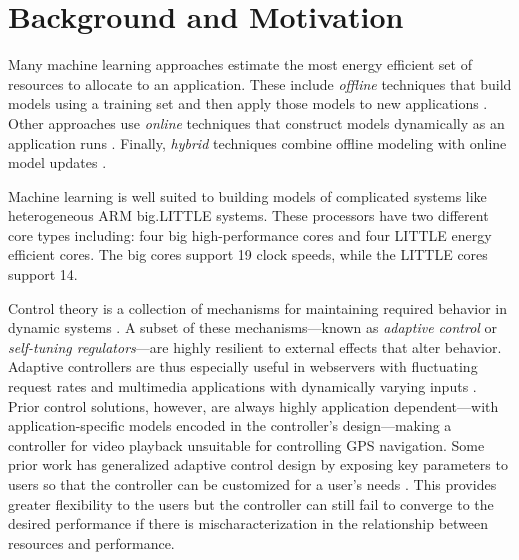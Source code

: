 \section{Background and Motivation}
\label{sec:example}

Many machine learning approaches estimate the most energy efficient
set of resources to allocate to an application.  These include
\emph{offline} techniques that build models using a training set and
then apply those models to new applications
\cite{Yi2003,LeeBrooks2006,CPR,ChenJohn2011,reddiHPCA2013,Paragon,PUPiL}.
Other approaches use \emph{online} techniques that construct models
dynamically as an application runs
\cite{Li2006,Flicker,ParallelismDial,Ponamarev,LeeBrooks}.  Finally,
\emph{hybrid} techniques combine offline modeling with online model
updates \cite{Zhang2012,packandcap,Winter2010,dubach2010,Koala,Cinder,
  wu2012inferred,LEO}.  

Machine learning is well suited to building
models of complicated systems like heterogeneous ARM big.LITTLE
systems.  These processors have two different core types including:
four big high-performance cores and four LITTLE energy efficient
cores.  The big cores support 19 clock speeds, while the LITTLE cores
support 14.

Control theory is a collection of mechanisms for maintaining required
behavior in dynamic systems \cite{Hellerstein2004a}. A subset of these
mechanisms---known as \emph{adaptive control} or \emph{self-tuning
  regulators}---are highly resilient to external effects that alter
behavior.  Adaptive controllers are thus especially useful in
webservers with fluctuating request rates
\cite{Horvarth,LuEtAl-2006a,SunDaiPan-2008a} and multimedia
applications with dynamically varying inputs
\cite{TCST,Agilos,grace2}.  Prior control solutions, however, are
always highly application dependent---with application-specific models
encoded in the controller's design---making a controller for video
playback unsuitable for controlling GPS navigation.  Some prior work
has generalized adaptive control design by exposing key parameters to
users so that the controller can be customized for a user's needs
\cite{ControlWare,POET}.  
This provides greater flexibility to the users but the controller can still fail to converge to the desired performance if there is mischaracterization in the relationship between resources and performance.  

